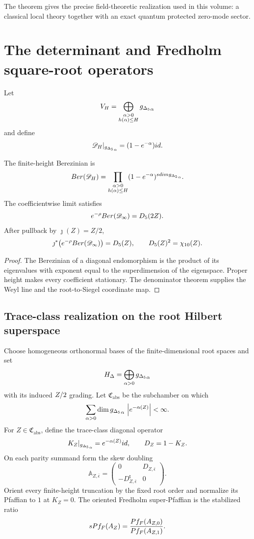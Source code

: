 The theorem gives the precise field-theoretic realization used in this volume: a classical local theory together with an exact quantum protected zero-mode sector.

\chapter{The determinant and Fredholm square-root operators}
Let
\[
 V_H=\bigoplus_{\substack{\alpha>0\\h(\alpha)\le H}}{g_{\Delta_5}}_\alpha
\]
and define
\[
 \mathscr D_H|_{{g_{\Delta_5}}_\alpha}=(1-e^{-\alpha})id.
\]

\begin{theorem}
The finite-height Berezinian is
\[
 Ber(\mathscr D_H)
 =\prod_{\substack{\alpha>0\\h(\alpha)\le H}}
 (1-e^{-\alpha})^{sdim{g_{\Delta_5}}_\alpha}.
\]
The coefficientwise limit satisfies
\[
 e^{-\rho}Ber(\mathscr D_\infty)={D_5}(2Z).
\]
After pullback by $\jmath(Z)=Z/2$,
\[
 \jmath^*\!\left(e^{-\rho}Ber(\mathscr D_\infty)\right)={D_5}(Z),
 \qquad {D_5}(Z)^2={\chi_{10}}(Z).
\]
\end{theorem}
\begin{proof}
The Berezinian of a diagonal endomorphism is the product of its eigenvalues with exponent equal to the superdimension of the eigenspace.  Proper height makes every coefficient stationary.  The denominator theorem supplies the Weyl line and the root-to-Siegel coordinate map.
\end{proof}

\section{Trace-class realization on the root Hilbert superspace}
Choose homogeneous orthonormal bases of the finite-dimensional root spaces and set
\[
 H_{\Delta}=\bigoplus_{\alpha>0}{g_{\Delta_5}}_\alpha
\]
with its induced $Z/2$ grading.  Let $\mathfrak C_{\mathrm{abs}}$ be the subchamber on which
\[
 \sum_{\alpha>0}\dim{g_{\Delta_5}}_\alpha\,
       \left|e^{-\alpha(Z)}\right|<\infty.
\]
For $Z\in\mathfrak C_{\mathrm{abs}}$, define the trace-class diagonal operator
\[
 K_Z|_{{g_{\Delta_5}}_\alpha}=e^{-\alpha(Z)}id,
 \qquad D_Z=1-K_Z.
\]
On each parity summand form the skew doubling
\[
 \mathbb A_{Z,\bar\epsilon}=
 \begin{pmatrix}0&D_{Z,\bar\epsilon}\\-D_{Z,\bar\epsilon}^{\mathsf t}&0\end{pmatrix}.
\]
Orient every finite-height truncation by the fixed root order and normalize its Pfaffian to $1$ at $K_Z=0$.  The oriented Fredholm super-Pfaffian is the stabilized ratio
\[
 sPf_{F}(A_Z)
 =\frac{Pf_F(A_{Z,0})}
        {Pf_F(A_{Z,1})}.
\]

